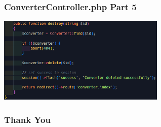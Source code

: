 \documentclass[aspectratio=169, table]{beamer}
\begin{document}
\begin{frame}[fragile]
 \frametitle{ConverterController.php Part 5}
 \vskip1cm
 \begin{center}
  \includegraphics[width=0.6\textwidth]{classFiles/pertemuan-12-controller-part-5.png}
 \end{center}
\end{frame}

\begin{frame4}
    \frametitle{Thank You}
\end{frame4}
\end{document}
